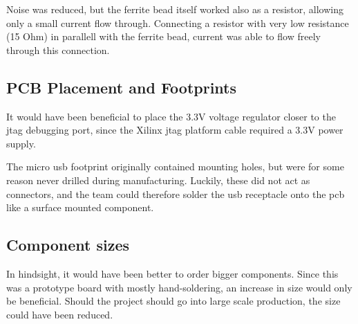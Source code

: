 Noise was reduced, but the ferrite bead itself worked also as a resistor, allowing only a small current flow through.
Connecting a resistor with very low resistance (15 Ohm) in parallell with the ferrite bead, current was able to flow freely through this connection.

\subsection{PCB Placement and Footprints}
It would have been beneficial to place the 3.3V voltage regulator closer to the \gls{jtag} debugging port, since the Xilinx \gls{jtag} platform cable required a 3.3V power supply.

The micro \gls{usb} footprint originally contained mounting holes, but were for some reason never drilled during manufacturing.
Luckily, these did not act as connectors, and the team could therefore solder the \gls{usb} receptacle onto the \gls{pcb} like a surface mounted component.

\subsection{Component sizes}
In hindsight, it would have been better to order bigger components.
Since this was a prototype board with mostly hand-soldering, an increase in size would only be beneficial.
Should the project should go into large scale production, the size could have been reduced.

